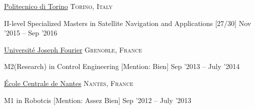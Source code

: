 \documentclass[10pt,a4paper]{article} %
\begin{document}
% 


\spacedhrule{-0.2em}{-0.4em} %



\headedsection %
{\href{https://didattica.polito.it/master/navigation/2016/course_syllabus}{Politecnico di Torino}}
{\textsc{Torino, Italy}} {

\headedsubsection %
{II-level Specialized Masters in Satellite Navigation and Applications [27/30]}
{Nov '2015 -- Sep '2016}
{}
}


\headedsection %
{\href{http://www.gipsa-lab.grenoble-inp.fr/MiSCIT/courses/}{Universit\'e Joseph Fourier}}
{\textsc{Grenoble, France}} {

\headedsubsection %
{M2(Research) in Control Engineering [Mention: Bien]}
{Sep '2013 -- July '2014} 
{}
}


\headedsection %
{\href{http://emaro.irccyn.ec-nantes.fr/index.php/studies}{\'Ecole Centrale de Nantes}}
{\textsc{Nantes, France}} {

\headedsubsection %
{M1 in Robotcis [Mention: Assez Bien]}
{Sep '2012 -- July '2013}
{}
}
\end{document}
